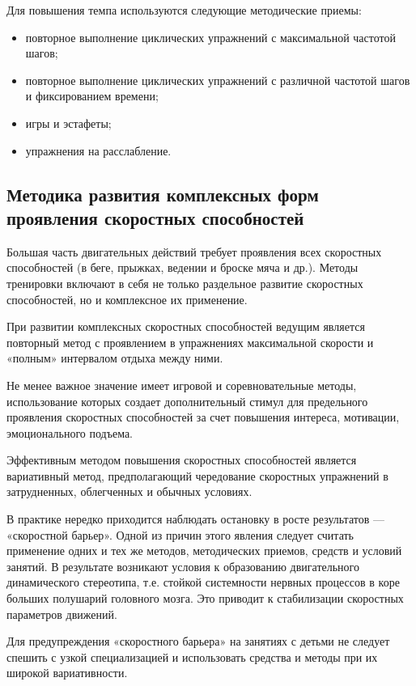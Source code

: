 Для повышения темпа используются следующие методические приемы:
\begin{itemize}
    \item повторное выполнение циклических упражнений с максимальной частотой шагов;
    \item повторное выполнение циклических упражнений с различной частотой шагов и фиксированием времени;
    \item игры и эстафеты;
    \item упражнения на расслабление.
\end{itemize}

\subsection*{Методика развития комплексных форм проявления скоростных способностей}

Большая часть двигательных действий требует проявления всех скоростных способностей (в беге, прыжках, ведении и броске мяча и др.).
Методы тренировки включают в себя не только раздельное развитие скоростных способностей, но и комплексное их применение.

При развитии комплексных скоростных способностей ведущим является повторный метод с проявлением в упражнениях максимальной
скорости и «полным» интервалом отдыха между ними.

Не менее важное значение имеет игровой и соревновательные методы, использование которых создает дополнительный стимул для
предельного проявления скоростных способностей за счет повышения интереса, мотивации, эмоционального подъема.

Эффективным методом повышения скоростных способностей является вариативный метод, предполагающий чередование скоростных
упражнений в затрудненных, облегченных и обычных условиях.

В практике нередко приходится наблюдать остановку в росте результатов — «скоростной барьер». Одной из причин этого явления
следует считать применение одних и тех же методов, методических приемов, средств и условий занятий. В результате возникают
условия к образованию двигательного динамического стереотипа, т.е. стойкой системности нервных процессов в коре
больших полушарий головного мозга. Это приводит к стабилизации скоростных параметров движений.

Для предупреждения «скоростного барьера» на занятиях с детьми не следует спешить с узкой специализацией и использовать
средства и методы при их широкой вариативности.

